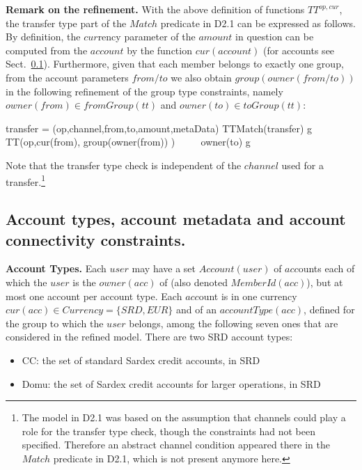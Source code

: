 {\bf Remark on the refinement.} With the above definition of functions $TT^{op,cur}$, the transfer type part of the $Match$ predicate in D2.1 can be expressed as follows. By definition, the $cur$rency parameter of the $amount$ in question can be computed from the $account$ by the function $cur(account)$ (for accounts see Sect.~\ref{sect:accounts}).
Furthermore, given that each member belongs to exactly one group, from the account parameters $from/to$ we also obtain $group(owner(from/to))$ in the following refinement of the group type constraints, namely $owner(from) \in fromGroup(tt) $ and $owner(to) \in toGroup(tt)$: 


\begin{asm}
\LET transfer = (op,channel,from,to,amount,metaData) \+
TTMatch(transfer) \IFF \+
\FORSOME g   \in	TT(op,cur(from), group(owner(from)) ) ~~~~  
    owner(to) \in g
\end{asm}

Note that the transfer type check is independent of the $channel$ used for a transfer.\footnote{The model in D2.1 was based on the assumption that channels could play a role for the transfer type check, though the constraints had not been specified. Therefore an abstract channel condition appeared there in the $Match$ predicate in D2.1, which is not present anymore here.}



\subsection{Account types, account metadata and account connectivity constraints.}
\label{sect:accounts}

{\bf Account Types.} Each $user$ may have a set $Account(user)$ of $acc$ounts each of which the $user$ is the  $owner(acc)$ of (also denoted $MemberId(acc)$), but at most one account per account type. Each $acc$ount is in one currency $cur(acc) \in Currency=\{SRD,EUR\}$ and of an $accountType(acc)$, defined for the group to which the $user$ belongs, among the following seven ones that are considered in the refined model. There are two SRD account types:
\begin{itemize}
	\item CC: the set of standard Sardex credit accounts, in SRD
	\item Domu:  the set of Sardex credit accounts for larger operations, in SRD
\end{itemize}

